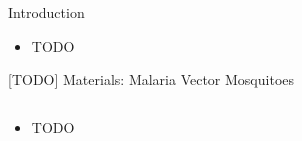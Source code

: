 \documentclass[final,hyperref={pdfpagelabels=false}]{beamer}
\begin{document}
\begin{frame}[t]
\begin{columns}[t]
\begin{column}{.465\textwidth}
\begin{block}{Introduction}
\begin{itemize}
\item TODO
\end{itemize}

\end{block}


\begin{block}{[TODO] Materials: Malaria Vector Mosquitoes}

\begin{columns} %
\begin{column}{.4\textwidth} %
\begin{itemize}
\item TODO
\end{itemize}
\end{column}

\begin{column}{.6\textwidth} %
\centering


\end{column}
\end{columns}
\end{block}
\end{column}
\end{columns}
\end{frame}
\end{document}
